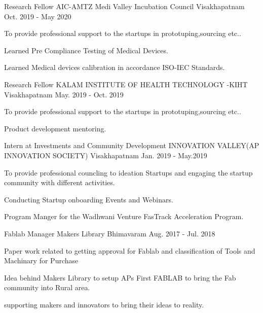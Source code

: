 \begin{cventries}
	\cventry
    {Research Fellow}
	{AIC-AMTZ Medi Valley Incubation Council}
	{Visakhapatnam}
	{Oct. 2019 - May 2020}
	{
		\begin{cvitems}
			\item {To provide professional support to the startups in prototuping,sourcing etc..}
			\item { Learned Pre Compliance Testing of Medical Devices.}
			\item { Learned Medical devices calibration in accordance ISO-IEC Standards.}
		\end{cvitems}
	}

 \cventry
    {Research Fellow}
    {KALAM INSTITUTE OF HEALTH TECHNOLOGY -KIHT}
    {Visakhapatnam}
    {May. 2019 - Oct. 2019}
    {
      \begin{cvitems}
        \item {To provide professional support to the startups in prototuping,sourcing etc..}
        \item {Product development mentoring.}
      \end{cvitems}
    }

  \cventry
    {Intern at Investments and Community Development}
    {INNOVATION VALLEY(AP INNOVATION SOCIETY)}
    {Visakhapatnam}
    {Jan. 2019 - May.2019}
    {
      \begin{cvitems}
        \item {To provide professional councling to ideation Startups and engaging the startup community with different activities.}
        \item {Conducting Startup onboarding Events and Webinars.}
        \item {Program Manger for the Wadhwani Venture FasTrack Acceleration Program.}
      \end{cvitems}
    }

  \cventry
    {Fablab Manager}
    {Makers Library}
    {Bhimavaram}
    {Aug. 2017 - Jul. 2018}
    {
      \begin{cvitems}
        \item {Paper work related to getting approval for Fablab and classification of Tools and Machinary for Purchase}
	\item{Idea behind Makers Library to setup APs First FABLAB to bring the Fab community into Rural area.}
        \item {supporting makers and innovators to bring their ideas to reality.}
      \end{cvitems}
    }


\end{cventries}

